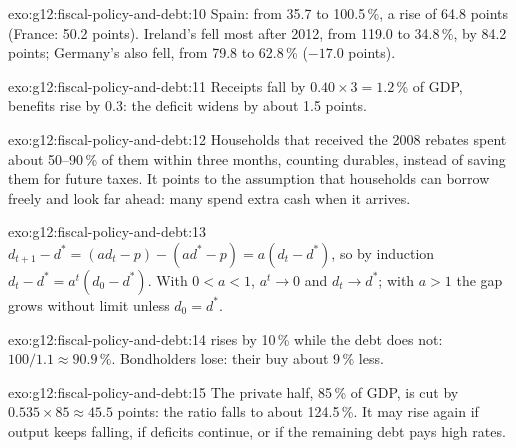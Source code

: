 \begin{solution}{exo:g12:fiscal-policy-and-debt:10}
Spain: from 35.7 to 100.5\,\%, a rise of 64.8 points (France: 50.2 points). Ireland's fell most after 2012, from 119.0 to 34.8\,\%, by 84.2 points; Germany's also fell, from 79.8 to 62.8\,\% ($-17.0$ points).
\end{solution}

\begin{solution}{exo:g12:fiscal-policy-and-debt:11}
Receipts fall by $0.40 \times 3 = 1.2$\,\% of GDP, benefits rise by 0.3: the deficit widens by about 1.5 points.
\end{solution}

\begin{solution}{exo:g12:fiscal-policy-and-debt:12}
Households that received the 2008 rebates spent about 50--90\,\% of them within three months, counting durables, instead of saving them for future taxes. It points to the
assumption that households can borrow freely and look far ahead: many spend extra cash when it arrives.
\end{solution}

\begin{solution}{exo:g12:fiscal-policy-and-debt:13}
$d_{t+1} - d^* = (a d_t - p) - (a d^* - p) = a (d_t - d^*)$, so by induction $d_t - d^* = a^t (d_0 - d^*)$. With $0 < a < 1$, $a^t \to 0$ and $d_t \to d^*$; with $a > 1$ the gap
grows without limit unless $d_0 = d^*$.
\end{solution}

\begin{solution}{exo:g12:fiscal-policy-and-debt:14}
 rises by 10\,\% while the debt does not: $100/1.1 \approx 90.9\,\%$. Bondholders lose: their  buy about 9\,\% less.
\end{solution}

\begin{solution}{exo:g12:fiscal-policy-and-debt:15}
The private half, 85\,\% of GDP, is cut by $0.535 \times 85 \approx 45.5$ points: the ratio falls to about 124.5\,\%. It may rise again if output keeps falling, if deficits
continue, or if the remaining debt pays high rates.
\end{solution}


